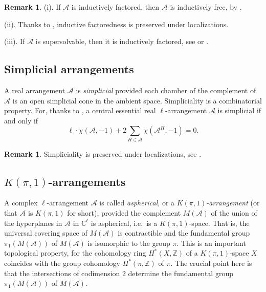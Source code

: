 \documentclass[12pt]{amsart}
\newcommand\CA{{\mathscr A}}
\newcommand\BBC{{\mathbb C}}
\newcommand\BBZ{{\mathbb Z}}
\numberwithin{equation}{section}
\theoremstyle{plain}
\theoremstyle{definition}
\newtheorem{remark}[equation]{Remark}
\begin{document}
\begin{remark}
	\label{rem:localindfac}
	(i). 	
	If $\CA$ is inductively factored, then  $\CA$ is inductively free,
	by \cite[Prop.~3.14]{hogeroehrle:factored}.
	
	(ii).
	Thanks to \cite[Thm.~1.1]{moellerroehrle:indfac}, 
	inductive factoredness  is preserved under localizations.
	
	(iii). If $\CA$ is supersolvable, then it is inductively factored, see \cite{jambuparis:factored} or \cite[Prop.~3.11]{hogeroehrle:factored}.
\end{remark}

\subsection{Simplicial arrangements}
\label{ssect:simplicial}

A real arrangement $\CA$ is \emph{simplicial} provided each chamber of the complement of $\CA$ is an open simplicial cone in the ambient space.
Simpliciality is a combinatorial property. For, thanks to  \cite[Cor.~2.4]{cuntzgeiss}, a central essential real $\ell$-arrangement 
$\CA$ is simplicial if and only if 
\begin{equation}
	\label{eq:simplicial}
	\ell \cdot \chi(\CA, -1) + 2\sum_{H \in \CA} \chi(\CA^H, -1) = 0.
\end{equation}

\begin{remark}
	\label{rem:localsimplicial}
	Simpliciality is preserved under localizations, see \cite[Lem.~2.17(1)]{Cunzmuecksch:sssimplicial}.
\end{remark}

\subsection{$K(\pi,1)$-arrangements}
\label{ssect:kpionearrangements}
A complex $\ell$-arrangement $\CA$ is called  \emph{aspherical}, or a
\emph{$K(\pi,1)$-arrangement} (or that $\CA$ is $K(\pi,1)$ for short), provided
the complement $M(\CA)$ of the union of the hyperplanes in
$\CA$ in $\BBC^\ell$ is aspherical, i.e.~is a
$K(\pi,1)$-space. That is, the universal covering space of $M(\CA)$
is contractible and the fundamental group
$\pi_1(M(\CA))$ of $M(\CA)$ is isomorphic to the group $\pi$.
This is an important
topological property, for
the cohomology ring $H^*(X, \BBZ)$ of a $K(\pi,1)$-space $X$
coincides
with the group cohomology $H^*(\pi, \BBZ)$ of $\pi$.
The crucial point here is that the intersections of codimension $2$
determine the fundamental group $\pi_1(M(\CA))$ of $M(\CA)$.
\end{document}
